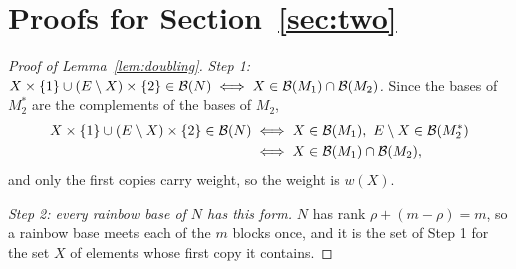 \section{Proofs for Section~\texorpdfstring{\ref{sec:two}}{5}}
\label{app:two}

\begin{proof}[Proof of Lemma~\ref{lem:doubling}]
\emph{Step 1: $X\times\{1\}\cup(E\setminus X)\times\{2\}\in\mathcal B(N)\iff X\in\mathcal B(M_1)\cap\mathcal B(M_2)$.}  Since the bases of $M_2^{*}$ are the complements of
the bases of $M_2$,
\[
  \begin{aligned}
  X\times\{1\}\cup(E\setminus X)\times\{2\}\in\mathcal B(N)
  &\iff X\in\mathcal B(M_1),\ E\setminus X\in\mathcal B(M_2^{*})\\
  &\iff X\in\mathcal B(M_1)\cap\mathcal B(M_2),
  \end{aligned}
\]
and only the first copies carry weight, so the weight is $w(X)$.

\emph{Step 2: every rainbow base of $N$ has this form.}  $N$ has rank $\rho+(m-\rho)=m$, so a rainbow
base meets each of the $m$ blocks once, and it is the set of Step 1 for the set
$X$ of elements whose first copy it contains.
\end{proof}

